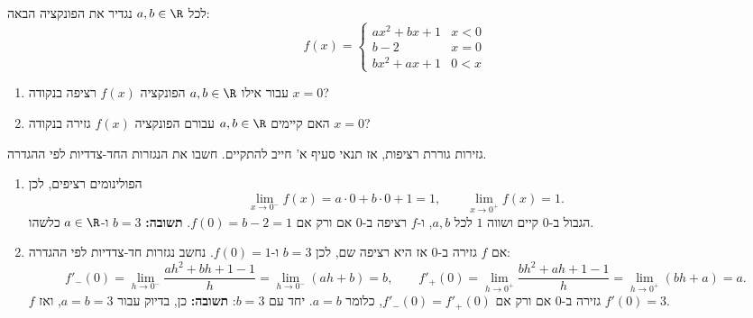 
\begin{question}
לכל $a,b\in\R$ נגדיר את הפונקציה הבאה:
\[ f(x)=\begin{cases} ax^2+bx+1 & x<0\\ b-2 & x=0\\ bx^2+ax+1 & 0<x\end{cases} \]
\begin{enumerate}
  \item עבור אילו $a,b\in\R$ הפונקציה $f(x)$ רציפה בנקודה $x=0$?
  \item האם קיימים $a,b\in\R$ עבורם הפונקציה $f(x)$ גזירה בנקודה $x=0$?
\end{enumerate}
\end{question}

\begin{hint}
גזירות גוררת רציפות, אז תנאי סעיף א' חייב להתקיים. חשבו את הנגזרות החד-צדדיות לפי ההגדרה.
\end{hint}

\begin{solution}
\begin{enumerate}
  \item הפולינומים רציפים, לכן
  \[ \lim_{x\to0^-}f(x)=a\cdot0+b\cdot0+1=1,\qquad \lim_{x\to0^+}f(x)=1. \]
  הגבול ב-$0$ קיים ושווה $1$ לכל $a,b$, ו-$f$ רציפה ב-$0$ אם ורק אם $f(0)=b-2=1$.
  \textbf{תשובה:} $b=3$ ו-$a\in\R$ כלשהו.
  \item אם $f$ גזירה ב-$0$ אז היא רציפה שם, לכן $b=3$ ו-$f(0)=1$. נחשב נגזרות חד-צדדיות לפי ההגדרה:
  \[ f'_-(0)=\lim_{h\to0^-}\frac{ah^2+bh+1-1}{h}=\lim_{h\to0^-}(ah+b)=b, \qquad f'_+(0)=\lim_{h\to0^+}\frac{bh^2+ah+1-1}{h}=\lim_{h\to0^+}(bh+a)=a. \]
  $f$ גזירה ב-$0$ אם ורק אם $f'_-(0)=f'_+(0)$, כלומר $a=b$. יחד עם $b=3$:
  \textbf{תשובה:} כן, בדיוק עבור $a=b=3$, ואז $f'(0)=3$.
\end{enumerate}
\end{solution}
